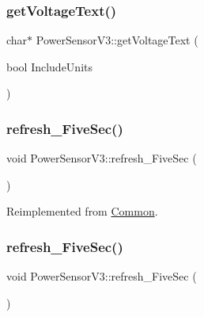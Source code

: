 \subsubsection{\texorpdfstring{get\+Voltage\+Text()}{getVoltageText()}\hspace{0.1cm}{\footnotesize\ttfamily [2/2]}}
{\footnotesize\ttfamily char$\ast$ Power\+Sensor\+V3\+::get\+Voltage\+Text (\begin{DoxyParamCaption}\item[{bool}]{Include\+Units }\end{DoxyParamCaption})}

\mbox{\label{class_power_sensor_v3_a1bf23a2cfa924933a5e265dc3a337ec4}} 
\subsubsection{\texorpdfstring{refresh\+\_\+\+Five\+Sec()}{refresh\_FiveSec()}\hspace{0.1cm}{\footnotesize\ttfamily [1/2]}}
{\footnotesize\ttfamily void Power\+Sensor\+V3\+::refresh\+\_\+\+Five\+Sec (\begin{DoxyParamCaption}{ }\end{DoxyParamCaption})\hspace{0.3cm}{\ttfamily [virtual]}}



Reimplemented from \hyperlink{class_common_a604ab36b3a1d9a5bcfcb225149c82f90}{Common}.

\mbox{\label{class_power_sensor_v3_a1bf23a2cfa924933a5e265dc3a337ec4}} 
\subsubsection{\texorpdfstring{refresh\+\_\+\+Five\+Sec()}{refresh\_FiveSec()}\hspace{0.1cm}{\footnotesize\ttfamily [2/2]}}
{\footnotesize\ttfamily void Power\+Sensor\+V3\+::refresh\+\_\+\+Five\+Sec (\begin{DoxyParamCaption}{ }\end{DoxyParamCaption})\hspace{0.3cm}{\ttfamily [virtual]}}



